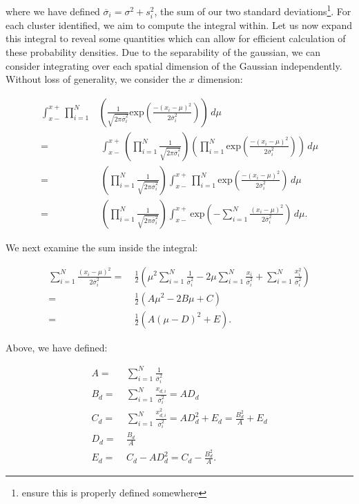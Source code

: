 \documentclass[11pt]{article}
\newcommand{\sig}{\overline{\sigma}_i}
\newcommand{\eq}{=&\ }
\begin{document}
where we have defined $\sig = \sigma^2 + s_i^2$, the sum of our two standard deviations\footnote{ensure this is properly defined somewhere}. For each cluster identified, we aim to compute the integral within. Let us now expand this integral to reveal some quantities which can allow for efficient calculation of these probability densities. Due to the separability of the gaussian, we can consider integrating over each spatial dimension of the Gaussian independently. Without loss of generality, we consider the $x$ dimension:

\begin{align} \label{muIntegralOneDimension}
	\int_{x-}^{x+} \prod_{i=1}^{N} & \left( \frac{1}{\sqrt{2\pi\sig^2}} \text{exp}\left( \frac{-(x_i-\mu)^2 }{ 2\sig^2 }\right)\right)\,d\mu \nonumber \\
	\eq \int_{x-}^{x+} \left(\prod_{i=1}^{N} \frac{1}{\sqrt{2\pi\sig^2}}\right)\left(\prod_{i=1}^{N} \text{exp}\left( \frac{-(x_i-\mu)^2 }{ 2\sig^2 }\right)\right)\,d\mu \nonumber \\
	\eq \left(\prod_{i=1}^{N} \frac{1}{\sqrt{2\pi\sig^2}}\right) \int_{x-}^{x+} \prod_{i=1}^{N} \text{exp}\left( \frac{-(x_i-\mu)^2 }{ 2\sig^2 }\right)\,d\mu \nonumber \\
	\eq \left(\prod_{i=1}^{N} \frac{1}{\sqrt{2\pi\sig^2}}\right) \int_{x-}^{x+} \text{exp}\left( -\sum_{i=1}^{N} \frac{(x_i-\mu)^2 }{ 2\sig^2 }\right)\,d\mu.
\end{align}

We next examine the sum inside the integral:

\begin{align*}
	\sum_{i=1}^{N} \frac{(x_i-\mu)^2 }{ 2\sig^2 } 
	\eq \frac{1}{2}\left( \mu^{2}\sum_{i=1}^{N}\frac{1}{\sig^2} - 2\mu\sum_{i=1}^{N}\frac{x_i}{\sig^2} + \sum_{i=1}^{N}\frac{x_i^2}{\sig^2} \right) \\
	\eq \frac{1}{2}\left( A\mu^{2} - 2B\mu + C \right) \\
	\eq \frac{1}{2}\left( A(\mu - D)^2 + E \right).                                                 
\end{align*}

Above, we have defined:

\begin{align}
	A \eq \sum_{i=1}^{N}\frac{1}{\sig^2} \\
	B_d \eq \sum_{i=1}^{N}\frac{x_{d,i}}{\sig^2} = AD_d \\
	C_d \eq \sum_{i=1}^{N}\frac{x_{d,i}^2}{\sig^2} = AD_d^2 + E_d = \frac{B_d^2}{A} + E_d \\     
	D_d \eq \frac{B_d}{A} \\
	E_d \eq C_d - AD_d^2 = C_d - \frac{B_d^2}{A}.
\end{align}
\end{document}
